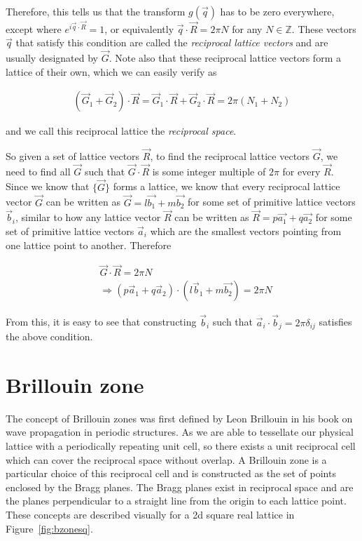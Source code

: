 Therefore, this tells us that the transform $g(\vec{q})$ has to be zero
everywhere, except where $e^{i\vec{q}\cdot\vec{R}}=1$, or equivalently
$\vec{q}\cdot\vec{R}=2\pi N$ for any $N\in \mathbb{Z}$. These vectors $\vec{q}$ that
satisfy this condition are called the \textit{reciprocal lattice vectors} and
are usually designated by $\vec{G}$. Note also that these reciprocal lattice
vectors form a lattice of their own, which we can easily verify as

\begin{align}
(\vec{G}_1+\vec{G}_2)\cdot\vec{R}=\vec{G}_1\cdot\vec{R}+\vec{G}_2\cdot\vec{R}=2\pi (N_1+N_2)
\end{align}
 
and we call this reciprocal lattice the \textit{reciprocal space}.

So given a set of lattice vectors $\vec{R}$, to find the reciprocal lattice
vectors $\vec{G}$, we need to find all $\vec{G}$ such that
$\vec{G}\cdot\vec{R}$ is some integer multiple of $2\pi$ for every $\vec{R}$.
Since we know that $\{\vec{G}\}$ forms a lattice, we know that every reciprocal
lattice vector $\vec{G}$ can be written as $\vec{G}=l\vec{b_1}+m\vec{b_2}$ for
some set of primitive lattice vectors $\vec{b}_i$, similar to how any lattice
vector $\vec{R}$ can be written as $\vec{R}=p\vec{a_1}+q\vec{a_2}$ for some set
of primitive lattice vectors $\vec{a}_i$ which are the smallest vectors
pointing from one lattice point to another. Therefore 

\begin{align}
  &\vec{G}\cdot\vec{R}=2\pi N \\
  &\Rightarrow (p\vec{a}_1+q\vec{a}_2)\cdot(l\vec{b}_1+m\vec{b_2})=2\pi N
\end{align}

From this, it is easy to see that constructing $\vec{b}_i$ such that
$\vec{a}_i\cdot\vec{b}_j=2\pi\delta_{ij}$ satisfies the above condition.

\section{Brillouin zone}
\label{brizones}

The concept of Brillouin zones was first defined by Leon Brillouin in his book
on wave propagation in periodic structures.\cite{brillouin} As we are able to
tessellate our physical lattice with a periodically repeating unit cell, so
there exists a unit reciprocal cell which can cover the reciprocal space
without overlap. A Brillouin zone is a particular choice of this reciprocal
cell and is constructed as the set of points enclosed by the Bragg planes. The
Bragg planes exist in reciprocal space and are the planes perpendicular to a
straight line from the origin to each lattice point. These concepts are
described visually for a 2d square real lattice in Figure~\ref{fig:bzonesq}.
